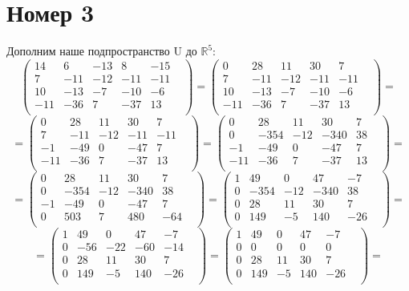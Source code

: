 \documentclass[a4paper,12pt]{article}
\begin{document}
\section*{Номер 3}
Дополним наше подпространство U до $\mathbb{R}^5$:
\[
\begin{pmatrix}
14 & 6 & -13 & 8 & -15 & \\
7 & -11 & -12 & -11 & -11 & \\
10 & -13 & -7 & -10 & -6 & \\
-11 & -36 & 7 & -37 & 13 & \\
\end{pmatrix}
=
\begin{pmatrix}
0 & 28 & 11 & 30 & 7 & \\
7 & -11 & -12 & -11 & -11 & \\
10 & -13 & -7 & -10 & -6 & \\
-11 & -36 & 7 & -37 & 13 & \\
\end{pmatrix}
=
\]
\[
=
\begin{pmatrix}
0 & 28 & 11 & 30 & 7 & \\
7 & -11 & -12 & -11 & -11 & \\
-1 & -49 & 0 & -47 & 7 & \\
-11 & -36 & 7 & -37 & 13 & \\
\end{pmatrix}
=
\begin{pmatrix}
0 & 28 & 11 & 30 & 7 & \\
0 & -354 & -12 & -340 & 38 & \\
-1 & -49 & 0 & -47 & 7 & \\
-11 & -36 & 7 & -37 & 13 & \\
\end{pmatrix}
=
\]
\[
=
\begin{pmatrix}
0 & 28 & 11 & 30 & 7 & \\
0 & -354 & -12 & -340 & 38 & \\
-1 & -49 & 0 & -47 & 7 & \\
0 & 503 & 7 & 480 & -64 & \\
\end{pmatrix}
=
\begin{pmatrix}
1 & 49 & 0 & 47 & -7 & \\
0 & -354 & -12 & -340 & 38 & \\
0 & 28 & 11 & 30 & 7 & \\
0 & 149 & -5 & 140 & -26 & \\
\end{pmatrix}
=
\]
\[
=
\begin{pmatrix}
1 & 49 & 0 & 47 & -7 & \\
0 & -56 & -22 & -60 & -14 & \\
0 & 28 & 11 & 30 & 7 & \\
0 & 149 & -5 & 140 & -26 & \\
\end{pmatrix}
=
\begin{pmatrix}
1 & 49 & 0 & 47 & -7 & \\
0 & 0 & 0 & 0 & 0 & \\
0 & 28 & 11 & 30 & 7 & \\
0 & 149 & -5 & 140 & -26 & \\
\end{pmatrix}
=
\]
\end{document}
